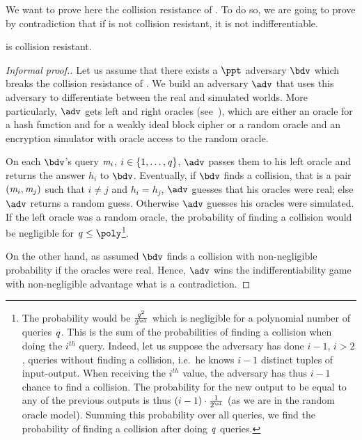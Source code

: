 We want to prove here the collision resistance of . To do so, we are going to prove by contradiction that if  is not collision resistant, it is not indifferentiable.

\begin{theorem}
     is collision resistant.
\end{theorem}
\begin{proof}[Informal proof.]
    Let us assume that there exists a $\ppt$ adversary $\bdv$ which breaks the collision resistance of . We build an adversary $\adv$ that uses this adversary to differentiate between the real and simulated worlds. More particularly, $\adv$ gets left and right oracles (see~\cite[Figure 3]{luykx2016security}), which are either an oracle for a hash function and for a weakly ideal block cipher or a random oracle and an encryption simulator with oracle access to the random oracle.

    On each $\bdv$'s query $\mathit{m}_i$, $i \in \{{1},\ldots,{\mathit{q}}\}$, $\adv$ passes them to his left oracle and returns the answer $h_i$ to $\bdv$.
    Eventually, if $\bdv$ finds a collision, that is a pair $(\mathit{m}_i, \mathit{m}_j)$ such that $i \neq j$ and $h_i = h_j$, $\adv$ guesses that his oracles were real; else $\adv$ returns a random guess. Otherwise $\adv$ guesses his oracles were simulated.
%
    If the left oracle was a random oracle, the probability of finding a collision would be negligible for $\queryBound \leq \poly$\footnote{The probability would be $\frac{\queryBound^2}{2^{\ol}}$ which is negligible for a polynomial number of queries $\mathit{q}$. This is the sum of the probabilities of finding a collision when doing the $i^{th}$ query. Indeed, let us suppose the adversary has done $i-1$, $i>2$, queries without finding a collision, i.e.~he knows $i-1$ distinct tuples of input-output. When receiving the $i^{th}$ value, the adversary has thus $i-1$ chance to find a collision. The probability for the new output to be equal to any of the previous outputs is thus $(i-1) \cdot \frac{1}{2^{\ol}}$ (as we are in the random oracle model). Summing this probability over all queries, we find the probability of finding a collision after doing $\mathit{q}$ queries.}.

    On the other hand, as assumed $\bdv$ finds a collision with non-negligible probability if the oracles were real.
    Hence, $\adv$ wins the indifferentiability game with non-negligible advantage what is a contradiction.
\end{proof}

